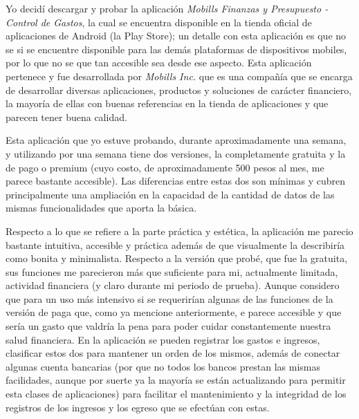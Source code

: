 \documentclass[11pt]{article}
\title{\titulo}
\author{ Universidad Virtual del Estado de Guanajuato \textbf{UVEG} \\ 
\materia \\ Benjamín Rivera \\ 19015478 }
\date{\textit{Fecha de entrega:} \today}
\begin{document}
	\maketitle
	
	\par Yo decidí descargar y probar la aplicación \textit{Mobills Finanzas y Presupuesto - Control de Gastos}, la cual se encuentra disponible en la tienda oficial de aplicaciones de Android (la Play Store); un detalle con esta aplicación es que no se si se encuentre disponible para las demás plataformas de dispositivos mobiles, por lo que no se que tan accesible sea desde ese aspecto. Esta aplicación pertenece y fue desarrollada por \textit{Mobills Inc.} que es una compañía que se encarga de desarrollar diversas aplicaciones, productos y soluciones de carácter financiero, la mayoría de ellas con buenas referencias en la tienda de aplicaciones y que parecen tener buena calidad. 
	
	\par Esta aplicación que yo estuve probando, durante aproximadamente una semana, y utilizando por una semana tiene dos versiones, la completamente gratuita y la de pago o premium (cuyo costo, de aproximadamente 500 pesos al mes, me parece bastante accesible). Las diferencias entre estas dos son mínimas y cubren principalmente una ampliación en la capacidad de la cantidad de datos de las mismas funcionalidades que aporta la básica.
	
	\par Respecto a lo que se refiere a la parte práctica y estética, la aplicación me parecio bastante intuitiva, accesible y práctica además de que visualmente la describiría como bonita y minimalista. Respecto a la versión que probé, que fue la gratuita, sus funciones me parecieron más que suficiente para mi, actualmente limitada, actividad financiera (y claro durante mi periodo de prueba). Aunque considero que para un uso más intensivo si se requerirían algunas de las funciones de la versión de paga que, como ya mencione anteriormente, e parece accesible y que sería un gasto que valdría la pena para poder cuidar constantemente nuestra salud financiera. En la aplicación se pueden registrar los gastos e ingresos, clasificar estos dos para mantener un orden de los mismos, además de conectar algunas cuenta bancarias (por que no todos los bancos prestan las mismas facilidades, aunque por suerte ya la mayoría se están actualizando para permitir esta clases de aplicaciones) para facilitar el mantenimiento y la integridad de los registros de los ingresos y los egreso que se efectúan con estas. 
	
\end{document}
